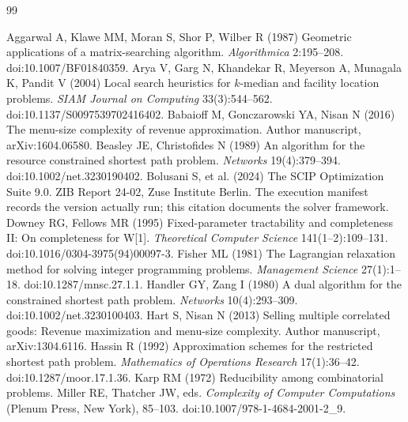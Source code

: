 \begin{thebibliography}{99}\raggedright
{}
Aggarwal A, Klawe MM, Moran S, Shor P, Wilber R (1987) Geometric applications of a matrix-searching algorithm. \emph{Algorithmica} 2:195--208. doi:10.1007/BF01840359.
Arya V, Garg N, Khandekar R, Meyerson A, Munagala K, Pandit V (2004) Local search heuristics for $k$-median and facility location problems. \emph{SIAM Journal on Computing} 33(3):544--562. doi:10.1137/S0097539702416402.
Babaioff M, Gonczarowski YA, Nisan N (2016) The menu-size complexity of revenue approximation. Author manuscript, arXiv:1604.06580.
Beasley JE, Christofides N (1989) An algorithm for the resource constrained shortest path problem. \emph{Networks} 19(4):379--394. doi:10.1002/net.3230190402.
Bolusani S, et al. (2024) The SCIP Optimization Suite 9.0. ZIB Report 24-02, Zuse Institute Berlin. The execution manifest records the version actually run; this citation documents the solver framework.
Downey RG, Fellows MR (1995) Fixed-parameter tractability and completeness II: On completeness for W[1]. \emph{Theoretical Computer Science} 141(1--2):109--131. doi:10.1016/0304-3975(94)00097-3.
Fisher ML (1981) The Lagrangian relaxation method for solving integer programming problems. \emph{Management Science} 27(1):1--18. doi:10.1287/mnsc.27.1.1.
Handler GY, Zang I (1980) A dual algorithm for the constrained shortest path problem. \emph{Networks} 10(4):293--309. doi:10.1002/net.3230100403.
Hart S, Nisan N (2013) Selling multiple correlated goods: Revenue maximization and menu-size complexity. Author manuscript, arXiv:1304.6116.
Hassin R (1992) Approximation schemes for the restricted shortest path problem. \emph{Mathematics of Operations Research} 17(1):36--42. doi:10.1287/moor.17.1.36.
Karp RM (1972) Reducibility among combinatorial problems. Miller RE, Thatcher JW, eds. \emph{Complexity of Computer Computations} (Plenum Press, New York), 85--103. doi:10.1007/978-1-4684-2001-2\_9.

\end{thebibliography}
